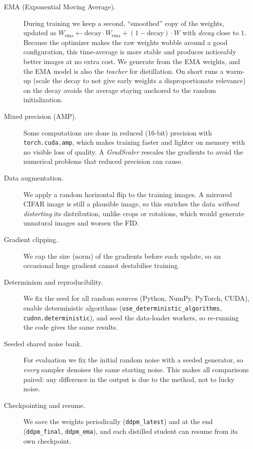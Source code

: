 \documentclass[11pt]{article}
\begin{document}
\begin{description}
  \item[EMA (Exponential Moving Average).] During training we keep a second, ``smoothed''
        copy of the weights, updated as $W_{\text{ema}} \leftarrow \text{decay}\cdot
        W_{\text{ema}} + (1-\text{decay})\cdot W$ with \emph{decay} close to $1$. Because
        the optimizer makes the raw weights wobble around a good configuration, this
        time-average is more stable and produces noticeably better images at no extra cost.
        We generate from the EMA weights, and the EMA model is also the \emph{teacher} for
        distillation. On short runs a warm-up (scale the decay to not give early weights a disproportionate relevance) on the decay avoids the average staying
        anchored to the random initialization.
  \item[Mixed precision (AMP).] Some computations are done in reduced (16-bit) precision
        with \texttt{torch.cuda.amp}, which makes training faster and lighter on memory
        with no visible loss of quality. A \emph{GradScaler} rescales the gradients to
        avoid the numerical problems that reduced precision can cause.
  \item[Data augmentation.] We apply a random horizontal flip to the training images. A
        mirrored CIFAR image is still a plausible image, so this enriches the data
        \emph{without distorting} its distribution, unlike crops or
        rotations, which would generate unnatural images and worsen the FID.
  \item[Gradient clipping.] We cap the size (norm) of the gradients before each update, so
        an occasional huge gradient cannot destabilise training.
  \item[Determinism and reproducibility.] We fix the seed for all random sources (Python,
        NumPy, PyTorch, CUDA), enable deterministic algorithms
        (\texttt{use\_deterministic\_algorithms}, \texttt{cudnn.deterministic}), and seed
        the data-loader workers, so re-running the code gives the same results.
  \item[Seeded shared noise bank.] For evaluation we fix the initial random noise with a
        seeded generator, so \emph{every} sampler denoises the same starting noise. This
        makes all comparisons paired: any difference in the output is due to the method,
        not to lucky noise.
  \item[Checkpointing and resume.] We save the weights periodically (\texttt{ddpm\_latest})
        and at the end (\texttt{ddpm\_final}, \texttt{ddpm\_ema}), and each distilled
        student can resume from its own checkpoint.
\end{description}
\end{document}
